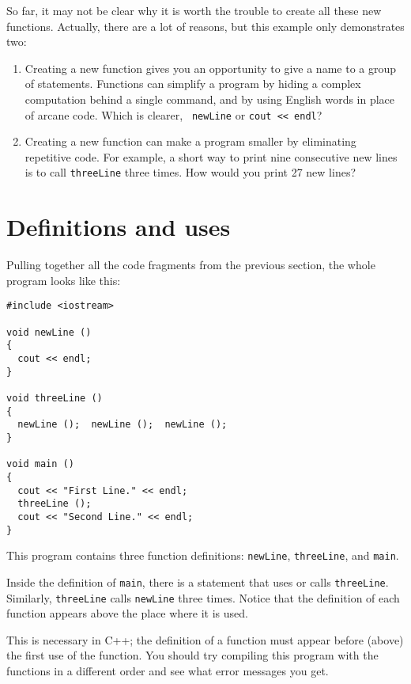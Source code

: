 So far, it may not be clear why it is worth the trouble to
create all these new functions.  Actually, there are a lot
of reasons, but this example only demonstrates two:

\begin{enumerate}

\item Creating a new function gives you an opportunity to
give a name to a group of statements.  Functions can simplify a program
by hiding a complex computation behind a single command, and by using
English words in place of arcane code.  Which is clearer, {\tt
newLine} or {\tt cout << endl}?

\item Creating a new function can make a program smaller by eliminating
repetitive code.  For example, a short way to print nine consecutive
new lines is to call {\tt threeLine} three times.  How would you
print 27 new lines?

\end{enumerate}

\section {Definitions and uses}

Pulling together all the code fragments from the previous
section, the whole program looks like this:

\begin{verbatim}
#include <iostream>

void newLine ()
{
  cout << endl;
}

void threeLine ()
{
  newLine ();  newLine ();  newLine ();
}

void main ()
{
  cout << "First Line." << endl;
  threeLine ();
  cout << "Second Line." << endl;
}
\end{verbatim}

This program contains three function definitions: {\tt newLine},
{\tt threeLine}, and {\tt main}.

Inside the definition of {\tt main}, there is a statement that
uses or calls {\tt threeLine}.  Similarly, {\tt threeLine} calls
{\tt newLine} three times.  Notice that the definition of each
function appears above the place where it is used.

This is necessary in C++; the definition of a function must
appear before (above) the first use of the function.  You
should try compiling this program with the functions in a
different order and see what error messages you get.

